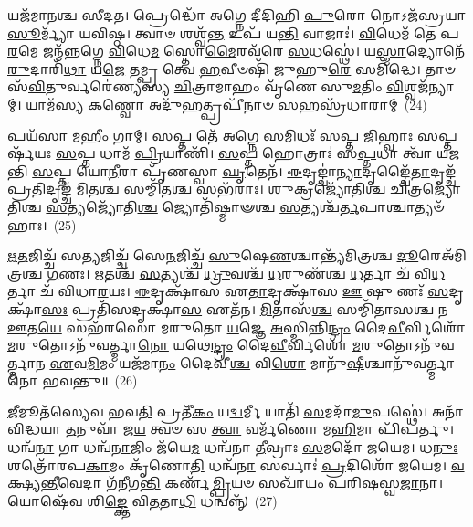 𑌯𑌜᳴𑌮𑌾𑌨𑌶𑍍𑌚 𑌸𑍀𑌦𑌤। 𑌪𑍍𑌰𑍇𑌦𑍍𑌧𑍋᳴ 𑌅𑌗𑍍𑌨𑍇 𑌦𑍀𑌦𑌿𑌹𑌿 \ul{𑌪𑍁}\-𑌰𑍋 𑌨𑍋\-𑌽𑌜᳴𑌸𑍍𑌰𑌯𑌾 \ul{𑌸𑍂}\-𑌰𑍍𑌮𑍍𑌯𑌾᳴ 𑌯𑌵𑌿𑌷𑍍𑌠। 𑌤𑍍𑌵𑌾𑍞 𑌶𑌶𑍍𑌵᳴\-\ul{𑌨𑍍𑌤} 𑌉𑌪᳴ 𑌯\-\ul{𑌨𑍍𑌤𑌿} 𑌵𑌾𑌜𑌾𑌃॑। \ul{𑌵𑌿}\-𑌧𑍇𑌮᳴ 𑌤𑍇 𑌪\-\ul{𑌰}\-𑌮𑍇 𑌜𑌨𑍍𑌮᳴𑌨𑍍𑌨𑌗𑍍𑌨𑍇 \ul{𑌵𑌿}\-𑌧𑍇\-\ul{𑌮} 𑌸𑍍𑌤𑍋\-\ul{𑌮𑍈}\-𑌰𑌵᳴𑌰𑍇 \ul{𑌸}\-𑌧𑌸𑍍𑌥𑍇॑। 𑌯\-\ul{𑌸𑍍𑌮𑌾}\-𑌦𑍍𑌯𑍋𑌨𑍇᳴\-\ul{𑌰𑍁}\-𑌦𑌾𑌰𑌿᳴\-\ul{𑌥𑌾} 𑌯\-\ul{𑌜𑍇} 𑌤𑌮𑍍𑌪𑍍𑌰 𑌤𑍍𑌵𑍇 \ul{𑌹}\-𑌵𑍀𑍞𑌷𑌿᳴ 𑌜𑍁𑌹𑍁\-\ul{𑌰𑍇} 𑌸𑌮𑌿᳴𑌦𑍍𑌧𑍇। 𑌤𑌾𑍞 𑌸᳴\-\ul{𑌵𑌿}\-𑌤𑍁𑌰𑍍𑌵𑌰𑍇॑𑌣𑍍𑌯𑌸𑍍𑌯 \ul{𑌚𑌿}\-𑌤𑍍𑌰𑌾𑌮𑌾𑌹𑌂 𑌵𑍃᳴𑌣𑍇 𑌸𑍁\-\ul{𑌮}\-𑌤𑌿𑌂 \ul{𑌵𑌿}\-𑌶𑍍𑌵𑌜᳴𑌨𑍍𑌯𑌾𑌮𑍍। 𑌯𑌾𑌮᳴\-\ul{𑌸𑍍𑌯} 𑌕\-\ul{𑌣𑍍𑌵𑍋} 𑌅𑌦𑍁᳴\-\ul{𑌹}\-𑌤𑍍𑌪𑍍𑌰𑌪𑍀᳴𑌨𑌾𑍞 \ul{𑌸}\-𑌹𑌸𑍍𑌰᳴𑌧𑌾𑌰𑌾𑌮𑍍~(24)

𑌪𑌯᳴𑌸𑌾 \ul{𑌮}\-𑌹𑍀𑌂 𑌗𑌾𑌮𑍍। \ul{𑌸}\-𑌪𑍍𑌤 𑌤𑍇᳴ 𑌅𑌗𑍍𑌨𑍇 \ul{𑌸}\-𑌮𑌿𑌧𑌃᳴ \ul{𑌸}\-𑌪𑍍𑌤 \ul{𑌜𑌿}\-𑌹𑍍𑌵𑌾𑌃 \ul{𑌸}\-𑌪𑍍𑌤𑌰𑍍\mbox{}𑌷᳴𑌯𑌃 \ul{𑌸}\-𑌪𑍍𑌤 𑌧𑌾𑌮᳴ \ul{𑌪𑍍𑌰𑌿}\-𑌯𑌾𑌣𑌿᳴। \ul{𑌸}\-𑌪𑍍𑌤 𑌹𑍋𑌤𑍍𑌰𑌾𑌃॑ 𑌸\-\ul{𑌪𑍍𑌤}\-𑌧𑌾 𑌤𑍍𑌵𑌾᳴ 𑌯𑌜𑌨𑍍𑌤𑌿 \ul{𑌸}\-𑌪𑍍𑌤 𑌯𑍋\-\ul{𑌨𑍀}\-𑌰𑌾 𑌪𑍃᳴𑌣𑌸𑍍𑌵𑌾 \ul{𑌘𑍃}\-𑌤𑍇𑌨᳴। \ul{𑌈}\-𑌦𑍃𑌙𑍍𑌚𑌾॑\-\ul{𑌨𑍍𑌯𑌾}\-𑌦𑍃𑌙𑍍𑌚𑍈᳴\-\ul{𑌤𑌾}\-𑌦𑍃𑌙𑍍𑌚᳴ 𑌪𑍍𑌰\-\ul{𑌤𑌿}\-𑌦𑍃𑌙𑍍𑌚᳴ \ul{𑌮𑌿}\-𑌤\-\ul{𑌶𑍍𑌚} 𑌸𑌮𑍍𑌮𑌿᳴𑌤\-\ul{𑌶𑍍𑌚} 𑌸𑌭᳴𑌰𑌾𑌃। \ul{𑌶𑍁}\-𑌕𑍍𑌰𑌜𑍍𑌯𑍋᳴𑌤𑌿𑌶𑍍𑌚 \ul{𑌚𑌿}\-𑌤𑍍𑌰𑌜𑍍𑌯𑍋᳴𑌤𑌿𑌶𑍍𑌚 \ul{𑌸}\-𑌤𑍍𑌯𑌜𑍍𑌯𑍋᳴𑌤𑌿\-\ul{𑌶𑍍𑌚} 𑌜𑍍𑌯𑍋𑌤𑌿᳴𑌷𑍍𑌮𑌾𑍟𑌶𑍍𑌚 \ul{𑌸}\-𑌤𑍍𑌯𑌶𑍍𑌚᳴\-\ul{𑌰𑍍𑌤}\-𑌪𑌾𑌶𑍍𑌚𑌾𑌤𑍍𑌯𑍞᳴𑌹𑌾𑌃।~(25)

\-\ul{𑌋}\-\-\ul{𑌤}\-𑌜𑌿𑌚𑍍𑌚᳴ 𑌸\-\ul{𑌤𑍍𑌯}\-𑌜𑌿𑌚𑍍𑌚᳴ 𑌸𑍇\-\ul{𑌨}\-𑌜𑌿𑌚𑍍𑌚᳴ \ul{𑌸𑍁}\-𑌷𑍇\-\ul{𑌣}\-𑌶𑍍𑌚𑌾𑌨𑍍𑌤𑍍𑌯᳴𑌮𑌿𑌤𑍍𑌰𑌶𑍍𑌚 \ul{𑌦𑍂}\-𑌰𑍇𑌅᳴𑌮𑌿𑌤𑍍𑌰𑌶𑍍𑌚 \ul{𑌗}\-𑌣𑌃। \ul{𑌋}\-𑌤𑌶𑍍𑌚᳴ \ul{𑌸}\-𑌤𑍍𑌯𑌶𑍍𑌚᳴ \ul{𑌧𑍍𑌰𑍁}\-𑌵𑌶𑍍𑌚᳴ \ul{𑌧}\-𑌰𑍁𑌣᳴𑌶𑍍𑌚 \ul{𑌧}\-𑌰𑍍𑌤𑌾 𑌚᳴ 𑌵𑌿\-\ul{𑌧}\-𑌰𑍍𑌤𑌾 𑌚᳴ 𑌵𑌿𑌧𑌾\-\ul{𑌰}\-𑌯𑌃। \ul{𑌈}\-𑌦𑍃𑌕𑍍𑌷𑌾᳴𑌸 𑌏\-\ul{𑌤𑌾}\-𑌦𑍃𑌕𑍍𑌷𑌾᳴𑌸 \ul{𑌊} 𑌷𑍁 𑌣𑌃᳴ \ul{𑌸}\-𑌦𑍃𑌕𑍍𑌷𑌾᳴\-\ul{𑌸𑌃} 𑌪𑍍𑌰𑌤𑌿᳴𑌸𑌦𑍃𑌕𑍍𑌷𑌾\-\ul{𑌸} 𑌏𑌤᳴𑌨। \ul{𑌮𑌿}\-𑌤𑌾𑌸᳴\-\ul{𑌶𑍍𑌚} 𑌸𑌮𑍍𑌮𑌿᳴𑌤𑌾𑌸𑌶𑍍𑌚 𑌨 \ul{𑌊}\-𑌤\-\ul{𑌯𑍇} 𑌸𑌭᳴𑌰𑌸𑍋 𑌮𑌰𑍁𑌤𑍋 \ul{𑌯}\-𑌜𑍍𑌞𑍇 \ul{𑌅}\-𑌸𑍍𑌮𑌿𑌨𑍍𑌨𑌿\-\ul{𑌨𑍍𑌦𑍍𑌰𑌂} 𑌦𑍈\-\ul{𑌵𑍀}\-𑌰𑍍𑌵𑌿𑌶𑍋᳴ \ul{𑌮}\-𑌰𑍁𑌤𑍋\-𑌽𑌨𑍁᳴𑌵𑌰𑍍𑌤𑍍𑌮𑌾\-\ul{𑌨𑍋} 𑌯𑌥𑍇\-\ul{𑌨𑍍𑌦𑍍𑌰𑌂} 𑌦𑍈\-\ul{𑌵𑍀}\-𑌰𑍍𑌵𑌿𑌶𑍋᳴ \ul{𑌮}\-𑌰𑍁𑌤𑍋\-𑌽𑌨𑍁᳴𑌵𑌰𑍍𑌤𑍍𑌮𑌾𑌨 \ul{𑌏}\-𑌵\-\ul{𑌮𑌿}\-𑌮𑌂 𑌯𑌜᳴𑌮𑌾\-\ul{𑌨𑌂} 𑌦𑍈𑌵𑍀॑\-\ul{𑌶𑍍𑌚} 𑌵𑌿\-\ul{𑌶𑍋} 𑌮𑌾𑌨𑍁᳴\-\ul{𑌷𑍀}\-𑌶𑍍𑌚𑌾𑌨𑍁᳴𑌵𑌰𑍍𑌤𑍍𑌮𑌾𑌨𑍋 𑌭𑌵𑌨𑍍𑌤𑍁॥~(26)

{\anuvakamend[{\-\ul{𑌅}\-\-\ul{𑌗𑌾}\-𑍞 \ul{𑌸}\-\-\ul{𑌹}\-\-\ul{𑌸𑍍𑌰𑌾}\-\-\ul{𑌕𑍍𑌷} \ul{𑌦𑍇}\-\-\ul{𑌵𑌾𑌃} \ul{𑌸}\-𑌹𑌸𑍍𑌰᳴𑌧𑌾\-\ul{𑌰𑌾}\-𑌮𑌤𑍍𑌯𑍞᳴\-\ul{𑌹𑌾} 𑌅𑌨𑍁᳴𑌵𑌰𑍍𑌤𑍍𑌮𑌾\-\ul{𑌨𑌃} 𑌷𑍋𑌡᳴𑌶 𑌚}]}%

\-\ul{𑌜𑍀}\-𑌮𑍂𑌤᳴𑌸𑍍𑌯𑍇𑌵 𑌭𑌵\-\ul{𑌤𑌿} 𑌪𑍍𑌰𑌤𑍀᳴\-\ul{𑌕𑌂} 𑌯\-\ul{𑌦𑍍𑌵}\-𑌰𑍍𑌮𑍀 𑌯𑌾𑌤𑌿᳴ \ul{𑌸}\-𑌮𑌦𑌾᳴\-\ul{𑌮𑍁}\-𑌪𑌸𑍍𑌥𑍇॑। 𑌅𑌨𑌾᳴𑌵𑌿𑌦𑍍𑌧𑌯𑌾 \ul{𑌤}\-𑌨𑍁𑌵𑌾᳴ 𑌜\-\ul{𑌯} 𑌤𑍍𑌵𑍞 𑌸 \ul{𑌤𑍍𑌵𑌾} 𑌵𑌰𑍍𑌮᳴𑌣𑍋 𑌮\-\ul{𑌹𑌿}\-𑌮𑌾 𑌪𑌿᳴𑌪𑌰𑍍𑌤𑍁। 𑌧𑌨𑍍𑌵᳴\-\ul{𑌨𑌾} 𑌗𑌾 𑌧𑌨𑍍𑌵᳴\-\ul{𑌨𑌾}\-𑌜𑌿𑌂 𑌜᳴𑌯𑍇\-\ul{𑌮} 𑌧𑌨𑍍𑌵᳴𑌨𑌾 \ul{𑌤𑍀}\-𑌵𑍍𑌰𑌾𑌃 \ul{𑌸}\-𑌮𑌦𑍋᳴ 𑌜𑌯𑍇𑌮। 𑌧\-\ul{𑌨𑍁𑌃} 𑌶𑌤𑍍𑌰𑍋᳴𑌰𑌪\-\ul{𑌕𑌾}\-𑌮𑌂 𑌕𑍃᳴𑌣𑍋\-\ul{𑌤𑌿} 𑌧𑌨𑍍𑌵᳴\-\ul{𑌨𑌾} 𑌸𑌰𑍍𑌵𑌾𑌃॑ \ul{𑌪𑍍𑌰}\-𑌦𑌿𑌶𑍋᳴ 𑌜𑌯𑍇𑌮। \ul{𑌵}\-𑌕𑍍𑌷𑍍𑌯\-\ul{𑌨𑍍𑌤𑍀}\-𑌵𑍇𑌦𑌾 𑌗᳴𑌨𑍀𑌗\-\ul{𑌨𑍍𑌤𑌿} 𑌕𑌰𑍍𑌣᳴\-\ul{𑌮𑍍𑌪𑍍𑌰𑌿}\-𑌯𑍞 𑌸𑌖𑌾᳴𑌯𑌂 𑌪𑌰𑌿𑌷𑌸𑍍𑌵\-\ul{𑌜𑌾}\-𑌨𑌾। 𑌯𑍋𑌷𑍇᳴𑌵 𑌶𑌿\-\ul{𑌙𑍍𑌕𑍍𑌤𑍇} 𑌵𑌿\-\ul{𑌤}\-𑌤𑌾\-\ul{𑌧𑌿} 𑌧𑌨𑍍𑌵𑌨𑍍𑌨𑍍᳴~(27)

